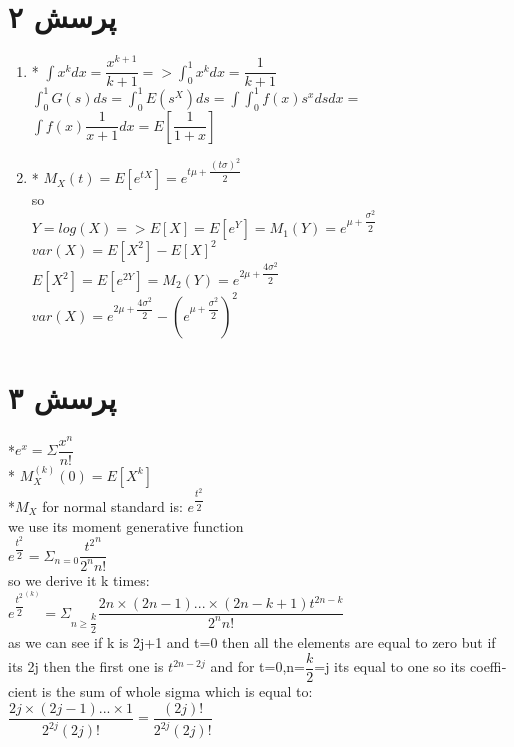 \documentclass[a4paper]{article}
\begin{document}
\section*{پرسش ۲}
\begin{latin}
\begin{enumerate}

\item{}
* $\int x^k dx = \dfrac{x^{k+1}}{k+1} => \int_0^1 x^k dx = \dfrac{1}{k+1}$\\
$\int _0^1 G(s)ds = \int_0^1 E(s^X)ds = \int \int_0^1 f(x) s^x ds dx = $\\
$  \int f(x)\dfrac{1}{x+1}dx = E[\dfrac{1}{1+x}]$\\
\item{}
* $M_X(t) = E[e^{tX}] = e^{t\mu + \dfrac{(t\sigma)^2}{2}}$\\
so\\
$ Y = log(X) => E[X]=E[e^Y]=M_1(Y) = e^{\mu + \dfrac{\sigma^2}{2}}$\\
$var(X) = E[X^2]-E[X]^2 $\\
$E[X^2] = E[e^{2Y}] = M_2(Y) = e^{2\mu + \dfrac{4\sigma^2}{2}} $\\
$var(X) = e^{2\mu + \dfrac{4\sigma^2}{2}} - (e^{\mu + \dfrac{\sigma^2}{2}})^2$\\
\end{enumerate}
\end{latin}
\pagebreak
\section*{پرسش ۳}
\begin{latin}
*$e^x= \Sigma \dfrac{x^n}{n!}$\\
* $M_X^{(k)}(0)=E[X^k]$\\
*$M_X$ for normal standard is: $e^{\dfrac{t^2}{2}}$\\
we use its moment generative function\\

$e^{\dfrac{t^2}{2}}= \Sigma_{n=0} \dfrac{{t^2}^n}{2^n n!}$\\
so we derive it k times:\\
$e^{\dfrac{t^2}{2}^{(k)}}= \Sigma_{n\geq \dfrac{k}{2}} \dfrac{2n\times (2n-1) ... \times (2n-k+1) t^{2n-k}}{2^n n!}$\\
as we can see if k is 2j+1 and t=0 then all the elements are equal to zero but if its 2j then the first one is $t^{2n-2j}$ and for t=0,n=$\dfrac{k}{2}$=j its equal to one so its coefficient is 
the sum of whole sigma which is equal to:\\
$\dfrac{2j \times (2j-1) ... \times 1}{2^{2j} (2j)!} = \dfrac{(2j)!}{2^{2j} (2j)!}$
\end{latin}
\pagebreak
\end{document}
